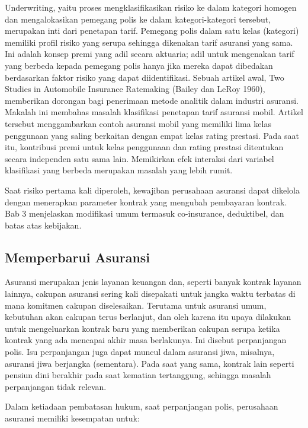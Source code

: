 \documentclass[
]{book}
\begin{document}
Underwriting, yaitu proses mengklasifikasikan risiko ke dalam kategori homogen dan mengalokasikan pemegang polis ke dalam kategori-kategori tersebut, merupakan inti dari penetapan tarif. Pemegang polis dalam satu kelas (kategori) memiliki profil risiko yang serupa sehingga dikenakan tarif asuransi yang sama. Ini adalah konsep premi yang adil secara aktuaria; adil untuk mengenakan tarif yang berbeda kepada pemegang polis hanya jika mereka dapat dibedakan berdasarkan faktor risiko yang dapat diidentifikasi. Sebuah artikel awal, Two Studies in Automobile Insurance Ratemaking (Bailey dan LeRoy 1960), memberikan dorongan bagi penerimaan metode analitik dalam industri asuransi. Makalah ini membahas masalah klasifikasi penetapan tarif asuransi mobil. Artikel tersebut menggambarkan contoh asuransi mobil yang memiliki lima kelas penggunaan yang saling berkaitan dengan empat kelas rating prestasi. Pada saat itu, kontribusi premi untuk kelas penggunaan dan rating prestasi ditentukan secara independen satu sama lain. Memikirkan efek interaksi dari variabel klasifikasi yang berbeda merupakan masalah yang lebih rumit.

Saat risiko pertama kali diperoleh, kewajiban perusahaan asuransi dapat dikelola dengan menerapkan parameter kontrak yang mengubah pembayaran kontrak. Bab 3 menjelaskan modifikasi umum termasuk co-insurance, deduktibel, dan batas atas kebijakan.

\hypertarget{memperbarui-asuransi}{%
\subsection{Memperbarui Asuransi}\label{memperbarui-asuransi}}

Asuransi merupakan jenis layanan keuangan dan, seperti banyak kontrak layanan lainnya, cakupan asuransi sering kali disepakati untuk jangka waktu terbatas di mana komitmen cakupan diselesaikan. Terutama untuk asuransi umum, kebutuhan akan cakupan terus berlanjut, dan oleh karena itu upaya dilakukan untuk mengeluarkan kontrak baru yang memberikan cakupan serupa ketika kontrak yang ada mencapai akhir masa berlakunya. Ini disebut perpanjangan polis. Isu perpanjangan juga dapat muncul dalam asuransi jiwa, misalnya, asuransi jiwa berjangka (sementara). Pada saat yang sama, kontrak lain seperti pensiun dini berakhir pada saat kematian tertanggung, sehingga masalah perpanjangan tidak relevan.

Dalam ketiadaan pembatasan hukum, saat perpanjangan polis, perusahaan asuransi memiliki kesempatan untuk:
\end{document}
